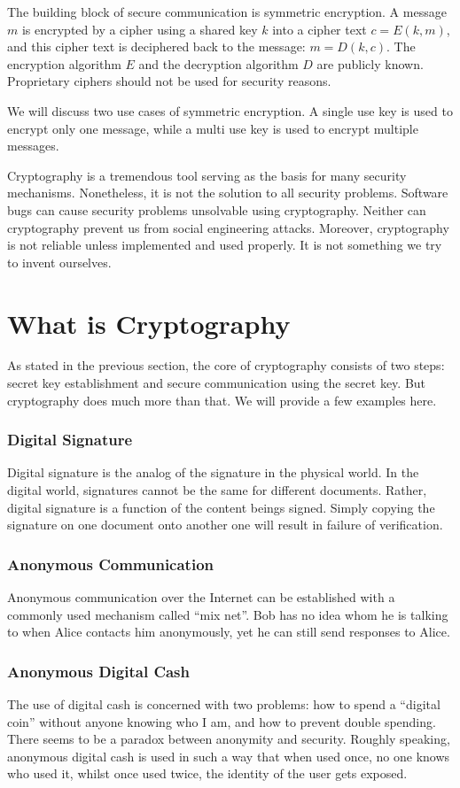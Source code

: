 The building block of secure communication is symmetric encryption. A message $m$ is encrypted by a cipher using a shared key $k$ into a cipher text $c=E(k,m)$, and this cipher text is deciphered back to the message: $m=D(k,c)$. The encryption algorithm $E$ and the decryption algorithm $D$ are publicly known. Proprietary ciphers should not be used for security reasons.

We will discuss two use cases of symmetric encryption. A single use key is used to encrypt only one message, while a multi use key is used to encrypt multiple messages. 

Cryptography is a tremendous tool serving as the basis for many security mechanisms. Nonetheless, it is not the solution to all security problems. Software bugs can cause security problems unsolvable using cryptography. Neither can cryptography prevent us from social engineering attacks. Moreover, cryptography is not reliable unless implemented and used properly. It is not something we try to invent ourselves. 

\section{What is Cryptography}
As stated in the previous section, the core of cryptography consists of two steps: secret key establishment and secure communication using the secret key. But cryptography does much more than that. We will provide a few examples here. 
\subsubsection{Digital Signature}
Digital signature is the analog of the signature in the physical world. In the digital world, signatures cannot be the same for different documents. Rather, digital signature is a function of the content beings signed. Simply copying the signature on one document onto another one will result in failure of verification.
\subsubsection{Anonymous Communication}
Anonymous communication over the Internet can be established with a commonly used mechanism called ``mix net''. Bob has no idea whom he is talking to when Alice contacts him anonymously, yet he can still send responses to Alice.
\subsubsection{Anonymous Digital Cash}
The use of digital cash is concerned with two problems: how to spend a ``digital coin'' without anyone knowing who I am, and how to prevent double spending. There seems to be a paradox between anonymity and security. Roughly speaking, anonymous digital cash is used in such a way that when used once, no one knows who used it, whilst once used twice, the identity of the user gets exposed. 
